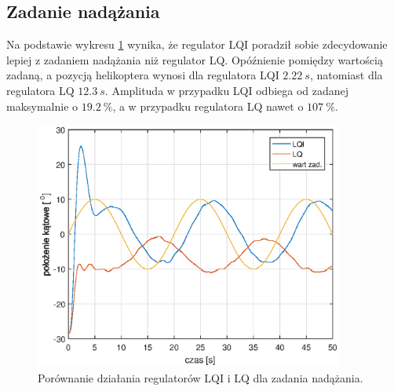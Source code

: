\documentclass[11pt,a4paper]{article}
\begin{document}
\subsection{Zadanie nadążania}
Na podstawie wykresu \ref{fig:por_foll_LQILQ} wynika, że regulator LQI poradził sobie zdecydowanie lepiej z zadaniem nadążania niż regulator LQ. Opó\'znienie pomiędzy wartością zadaną, a pozycją helikoptera wynosi dla regulatora LQI $2.22 \ s$, natomiast dla regulatora LQ $12.3 \ s$. Amplituda w przypadku LQI odbiega od zadanej maksymalnie o $19.2 \ \%$, a w przypadku regulatora LQ nawet o $107 \ \%$. 
\begin{figure}[H]
	\centering
	\includegraphics[width=4in]{Figures/por_foll_LQLQI.eps}
	\caption{Porównanie działania regulatorów LQI i LQ dla zadania nadążania.}
	\label{fig:por_foll_LQILQ}
\end{figure}
\end{document}
